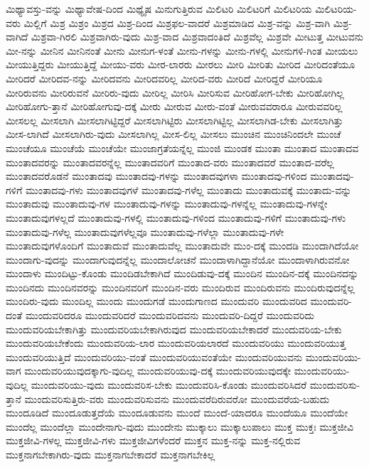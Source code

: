 {ಮಿಥ್ಯಾವಸ್ತು-ವನ್ನು
ಮಿಥ್ಯಾವೇಷ-ದಿಂದ
ಮಿಥ್ಯೈಷ
ಮಿನುಗುತ್ತಿರುವ
ಮಿಲಿಟರಿ
ಮಿಲಿಟರಿಗೆ
ಮಿಲಿಟರಿಯ
ಮಿಲಿಟರಿಯ-ವರು
ಮಿಲ್ಲಿಗೆ
ಮಿಶ್ರ
ಮಿಶ್ರಂ
ಮಿಶ್ರದ
ಮಿಶ್ರ-ದಿಂದ
ಮಿಶ್ರಫಲ-ವಾದರೆ
ಮಿಶ್ರಮಾಡಿದ
ಮಿಶ್ರ-ವನ್ನು
ಮಿಶ್ರ-ವಾಗಿ
ಮಿಶ್ರ-ವಾಗಿದೆ
ಮಿಶ್ರವಾ-ಗಿರಲಿ
ಮಿಶ್ರವಾಗಿರು-ವುದು
ಮಿಶ್ರ-ವಾದ
ಮಿಶ್ರವಾದಂತಿದೆ
ಮಿಶ್ರವೆಲ್ಲ
ಮಿಶ್ರವೇ
ಮೀಟುತ್ತ
ಮೀಟುವನು
ಮೀ-ನನ್ನು
ಮೀನಿನ
ಮೀನಿನಂತೆ
ಮೀನು
ಮೀನುಗ-ಳಂತೆ
ಮೀನು-ಗಳನ್ನು
ಮೀನು-ಗಳಲ್ಲಿ
ಮೀನುಗಳಿ-ಗಿಂತ
ಮೀಯಲು
ಮೀಯುತ್ತಿದ್ದರು
ಮೀಯುತ್ತಿದ್ದೆ
ಮೀಯು-ವರು
ಮೀರ-ಲಾರರು
ಮೀರಲು
ಮೀರಿ
ಮೀರಿತು
ಮೀರಿದ
ಮೀರಿದಂತೆಯೂ
ಮೀರಿದರೆ
ಮೀರಿದವ-ನನ್ನು
ಮೀರಿದವನು
ಮೀರಿದವರಿಲ್ಲ
ಮೀರಿದ-ವರು
ಮೀರಿದೆ
ಮೀರಿದ್ದರೆ
ಮೀರಿಯೂ
ಮೀರಿರುವನು
ಮೀರಿರುವನೆ
ಮೀರಿರು-ವುದು
ಮೀರಿಲ್ಲ
ಮೀರಿಸಿ
ಮೀರಿಸುವ
ಮೀರಿಹೋಗ-ಬೇಕು
ಮೀರಿಹೋಗಿಲ್ಲ
ಮೀರಿಹೋಗು-ತ್ತಾನೆ
ಮೀರಿಹೋಗುವು-ದಕ್ಕೆ
ಮೀರು
ಮೀರುವ
ಮೀರು-ವಂತೆ
ಮೀರುವವರಾರೂ
ಮೀರುವವರಿಲ್ಲ
ಮೀಸಲಲ್ಲ
ಮೀಸಲಾಗಿ
ಮೀಸಲಾಗಿಟ್ಟಿದ್ದರೆ
ಮೀಸಲಾಗಿಟ್ಟಿರು
ಮೀಸಲಾಗಿಟ್ಟಿಲ್ಲ
ಮೀಸಲಾಗಿಡ-ಬೇಕು
ಮೀಸಲಾಗಿತ್ತು
ಮೀಸ-ಲಾಗಿದೆ
ಮೀಸಲಾಗಿರು-ವುದು
ಮೀಸಲಾಗಿಲ್ಲ
ಮೀಸ-ಲಿಲ್ಲ
ಮೀಸಲು
ಮುಂಚಿನ
ಮುಂಚಿನಿಂದಲೇ
ಮುಂಚೆ
ಮುಂಚೆಯೂ
ಮುಂಚೆಯೆ
ಮುಂಚೆಯೇ
ಮುಂಜಾಗ್ರತೆಯನ್ನೆಲ್ಲ
ಮುಂಜಿ
ಮುಂಡಕ
ಮುಂತಾ
ಮುಂತಾದ
ಮುಂತಾದವ
ಮುಂತಾದವರನ್ನು
ಮುಂತಾದವರನ್ನೆಲ್ಲ
ಮುಂತಾದವರಿಗೆ
ಮುಂತಾದ-ವರು
ಮುಂತಾದವರೆ
ಮುಂತಾದ-ವರೆಲ್ಲ
ಮುಂತಾದವರೊಡನೆ
ಮುಂತಾದವು
ಮುಂತಾದವು-ಗಳನ್ನು
ಮುಂತಾದವುಗಳಾ
ಮುಂತಾದವು-ಗಳಿಂದ
ಮುಂತಾದವು-ಗಳಿಗೆ
ಮುಂತಾದವು-ಗಳು
ಮುಂತಾದವುಗಳೆ
ಮುಂತಾದವು-ಗಳೆಲ್ಲ
ಮುಂತಾದು
ಮುಂತಾದುವಕ್ಕೆ
ಮುಂತಾದು-ವನ್ನು
ಮುಂತಾದುವು
ಮುಂತಾದುವು-ಗಳ
ಮುಂತಾದುವು-ಗಳನ್ನು
ಮುಂತಾದುವು-ಗಳನ್ನೆಲ್ಲ
ಮುಂತಾದುವು-ಗಳನ್ನೇ
ಮುಂತಾದುವುಗಳಲ್ಲದೆ
ಮುಂತಾದುವು-ಗಳಲ್ಲಿ
ಮುಂತಾದುವು-ಗಳಿಂದ
ಮುಂತಾದುವು-ಗಳಿಗೆ
ಮುಂತಾದುವು-ಗಳು
ಮುಂತಾದುವು-ಗಳೆಲ್ಲ
ಮುಂತಾದುವುಗಳೆಲ್ಲವೂ
ಮುಂತಾದುವು-ಗಳೆಲ್ಲಾ
ಮುಂತಾದುವು-ಗಳೇ
ಮುಂತಾದುವುಗಳೊಂದಿಗೆ
ಮುಂತಾದುವೆ
ಮುಂತಾದುವೆಲ್ಲ
ಮುಂತಾದುವೇ
ಮುಂ-ದಕ್ಕೆ
ಮುಂದಡಿ
ಮುಂದಾಗಿದೆಯೋ
ಮುಂದಾಗು-ವುದನ್ನು
ಮುಂದಾಗುವುದನ್ನೆಲ್ಲ
ಮುಂದಾಲೋಚನೆ
ಮುಂದಾಳಾಗಿದ್ದಾನೆಯೋ
ಮುಂದಾಳಾಗಿರುವನೋ
ಮುಂದಾಳು
ಮುಂದಿಟ್ಟು-ಕೊಂಡು
ಮುಂದಿಡಬೇಕಾಗಿದೆ
ಮುಂದಿಡುವು-ದಕ್ಕೆ
ಮುಂದಿನ
ಮುಂದಿನ-ದಕ್ಕೆ
ಮುಂದಿನದನ್ನು
ಮುಂದಿನದು
ಮುಂದಿನವರನ್ನು
ಮುಂದಿನವರಿಗೆ
ಮುಂದಿನ-ವರು
ಮುಂದಿರುವ
ಮುಂದಿರುವನು
ಮುಂದಿರುವುದನ್ನೆಲ್ಲ
ಮುಂದಿರು-ವುದು
ಮುಂದಿಲ್ಲ
ಮುಂದು
ಮುಂದುಗಡೆ
ಮುಂದುಗಾಣದ
ಮುಂದುವರಿ
ಮುಂದುವರಿದ
ಮುಂದುವರಿ-ದಂತೆ
ಮುಂದುವರಿದರೂ
ಮುಂದುವರಿದರೆ
ಮುಂದುವರಿದವನು
ಮುಂದುವರಿ-ದಿದ್ದರೆ
ಮುಂದುವರಿದು
ಮುಂದುವರಿಯಬೇಕಾಗಿತ್ತು
ಮುಂದುವರಿಯಬೇಕಾಗಿರುವುದ
ಮುಂದುವರಿಯಬೇಕಾದರೆ
ಮುಂದುವರಿಯ-ಬೇಕು
ಮುಂದುವರಿಯಬೇಕೆಂದು
ಮುಂದುವರಿಯ-ಲಾರ
ಮುಂದುವರಿಯಲಾರದೆ
ಮುಂದುವರಿಯು
ಮುಂದುವರಿಯುತ್ತ
ಮುಂದುವರಿಯುತ್ತಿದೆ
ಮುಂದುವರಿಯು-ವಂತೆ
ಮುಂದುವರಿಯುವಂತೆಯೇ
ಮುಂದುವರಿಯುವನು
ಮುಂದುವರಿಯು-ವಾಗ
ಮುಂದುವರಿಯುವುದಕ್ಕಾಗು-ವುದಿಲ್ಲ
ಮುಂದುವರಿಯುವು-ದಕ್ಕೆ
ಮುಂದುವರಿಯುವುದಕ್ಕೇ
ಮುಂದುವರಿಯು-ವುದಿಲ್ಲ
ಮುಂದುವರಿಯು-ವುದು
ಮುಂದುವರಿಸ-ಬೇಕು
ಮುಂದುವರಿಸಿ-ಕೊಂಡು
ಮುಂದುವರಿಸಿದರೆ
ಮುಂದುವರಿಸು-ತ್ತಾನೆ
ಮುಂದುವರಿಸುತ್ತಿರು-ವರು
ಮುಂದುವರಿಸುವನು
ಮುಂದುವರೆದಿರುವರೋ
ಮುಂದುವರೆಯ-ಬಹುದು
ಮುಂದೂಡಿದೆ
ಮುಂದೂಡುತ್ತದೆಯೆ
ಮುಂದೂಡುವನು
ಮುಂದೆ
ಮುಂದೆ-ಯಾದರೂ
ಮುಂದೆಯೂ
ಮುಂದೆಯೇ
ಮುಂದೆಲ್ಲ
ಮುಂದೆಲ್ಲಾ
ಮುಂದೇನಾಗು-ವುದು
ಮುಂದೇನು
ಮುಕ್ಕಾಲು
ಮುಕ್ಕಾಲುಪಾಲು
ಮುಕ್ತ
ಮುಕ್ತಃ
ಮುಕ್ತಜೀವಿ
ಮುಕ್ತಜೀವಿ-ಗಳಲ್ಲ
ಮುಕ್ತಜೀವಿ-ಗಳು
ಮುಕ್ತಜೀವಿಗಳೆಂದರೆ
ಮುಕ್ತನ
ಮುಕ್ತ-ನನ್ನು
ಮುಕ್ತ-ನಲ್ಲಿರುವ
ಮುಕ್ತನಾಗಬೇಕಾಗಿರು-ವುದು
ಮುಕ್ತನಾಗಬೇಕಾದರೆ
ಮುಕ್ತನಾಗಬೇಕಿಲ್ಲ
}
